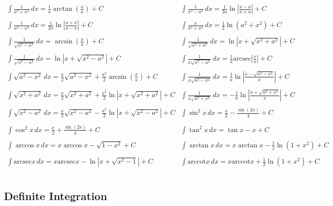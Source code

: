 \[
\begin{array}{ll}
\int \frac{1}{a^2 + x^2} \, dx = \frac{1}{a}\arctan\left(\frac{x}{a}\right) + C & \int \frac{1}{x^2 - a^2} \, dx = \frac{1}{2a}\ln\left|\frac{x-a}{x+a}\right| + C \\ \\
\int \frac{1}{a^2 - x^2} \, dx = \frac{1}{2a}\ln\left|\frac{a+x}{a-x}\right| + C & \int \frac{x}{a^2 + x^2} \, dx = \frac{1}{2}\ln(a^2 + x^2) + C \\ \\
\int \frac{1}{\sqrt{a^2 - x^2}} \, dx = \arcsin\left(\frac{x}{a}\right) + C & \int \frac{1}{\sqrt{x^2 + a^2}} \, dx = \ln|x + \sqrt{x^2 + a^2}| + C \\ \\
\int \frac{1}{\sqrt{x^2 - a^2}} \, dx = \ln|x + \sqrt{x^2 - a^2}| + C & \int \frac{1}{x\sqrt{x^2 - a^2}} \, dx = \frac{1}{a}\text{arcsec}\left|\frac{x}{a}\right| + C \\ \\
\int \sqrt{a^2 - x^2} \, dx = \frac{x}{2}\sqrt{a^2 - x^2} + \frac{a^2}{2}\arcsin\left(\frac{x}{a}\right) + C & \int \frac{1}{x\sqrt{a^2 - x^2}} \, dx = \frac{1}{a}\ln\left|\frac{a - \sqrt{a^2 - x^2}}{x}\right| + C \\ \\
\int \sqrt{x^2 + a^2} \, dx = \frac{x}{2}\sqrt{x^2 + a^2} + \frac{a^2}{2}\ln|x + \sqrt{x^2 + a^2}| + C & \int \frac{1}{x\sqrt{a^2 + x^2}} \, dx = -\frac{1}{a}\ln\left|\frac{a + \sqrt{a^2 + x^2}}{x}\right| + C \\ \\
\int \sqrt{x^2 - a^2} \, dx = \frac{x}{2}\sqrt{x^2 - a^2} - \frac{a^2}{2}\ln|x + \sqrt{x^2 - a^2}| + C & \int \sin^2 x \, dx = \frac{x}{2} - \frac{\sin(2x)}{4} + C \\ \\
\int \cos^2 x \, dx = \frac{x}{2} + \frac{\sin(2x)}{4} + C & \int \tan^2 x \, dx = \tan x - x + C \\ \\
\int \arccos x \, dx = x\arccos x - \sqrt{1-x^2} + C & \int \arctan x \, dx = x\arctan x - \frac{1}{2}\ln(1+x^2) + C \\ \\
\int \text{arcsec} x \, dx = x\text{arcsec} x - \ln|x + \sqrt{x^2 - 1}| + C & \int \text{arccot} x \, dx = x\text{arccot} x + \frac{1}{2}\ln(1+x^2) + C \\ \\
\end{array}
\]

\subsection{Definite Integration}

